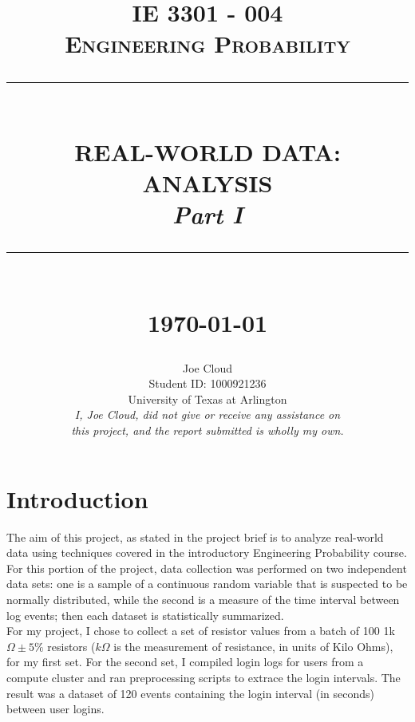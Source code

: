 \documentclass[10pt]{report}
\newcommand{\HRule}[1]{\rule{\linewidth}{#1}}
\begin{document}
\title{ \normalsize \textsc{IE 3301 - 004 \\ Engineering Probability}
        \\ [2.0cm]
        \HRule{0.5pt} \\
        \LARGE \textbf{\uppercase{Real-World Data: Analysis}} \\
        \normalsize \textit{Part I}
        \HRule{2pt} \\ [0.5cm]
        \normalsize \today \vspace*{5\baselineskip}}

\date{}

\author{
    Joe Cloud \\
        Student ID: 1000921236 \\
        University of Texas at Arlington \\[1in]
        \textit{I, Joe Cloud, did not give or receive any assistance on }\\
        \textit{this project, and the report submitted is wholly my own.}}



    \maketitle
\tableofcontents
\newpage

\sectionfont{\scshape}

\section*{Introduction}

The aim of this project, as stated in the project brief is to analyze real-world
data using techniques covered in the introductory Engineering Probability course. 
For this portion of the project, data collection was performed on two independent 
data sets: one is a sample of a continuous random variable that is suspected to be 
normally distributed, while the second is a measure of the time interval between log events; 
then each dataset is statistically summarized. \\ 
For my project, I chose to collect a set of resistor values from a batch of 100 
1k$\Omega \pm 5\%$ resistors ($k\Omega$ is the measurement of resistance, in units of Kilo Ohms), 
for my first set. For the second set, I compiled login logs for users from a compute cluster and 
ran preprocessing scripts to extrace the login intervals.
The result was a dataset of 120 events containing the login interval (in seconds) between user logins.
\end{document}
